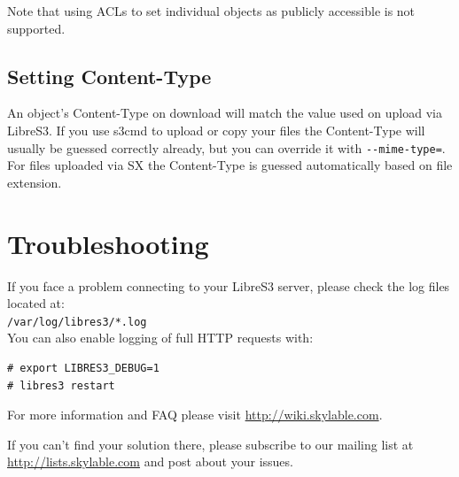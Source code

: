 Note that using ACLs to set individual objects as publicly accessible
is not supported.

\section*{Setting Content-Type}

An object's Content-Type on download will match the value used on upload
via LibreS3.
If you use s3cmd to upload or copy your files the Content-Type will usually be guessed
correctly already, but you can override it with \verb|--mime-type=|.
For files uploaded via SX the Content-Type is guessed automatically based on
file extension.

\chapter{Troubleshooting}
If you face a problem connecting to your LibreS3 server, please check
the log files located at:\\ \verb|/var/log/libres3/*.log|\\
You can also enable logging of full HTTP requests with:

\begin{lstlisting}
# export LIBRES3_DEBUG=1
# libres3 restart
\end{lstlisting}

For more information and FAQ please visit \url{http://wiki.skylable.com}.

If you can't find your solution there, please subscribe to our mailing list
at \url{http://lists.skylable.com} and post about your issues.

